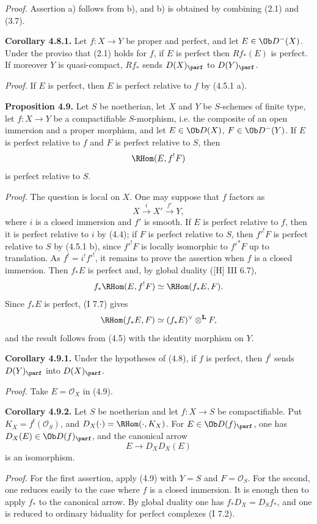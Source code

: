 \documentclass[11pt]{article}
\begin{document}
\emph{Proof.} Assertion a) follows from b), and b) is obtained by combining (2.1) and (3.7).

\textbf{Corollary 4.8.1.} Let \(f:X\to Y\) be proper and perfect, and let \(E\in\Ob D^{-}(X)\). Under the proviso that (2.1) holds for \(f\), if \(E\) is perfect then \(Rf_*(E)\) is perfect. If moreover \(Y\) is quasi-compact, \(Rf_*\) sends \(D(X)_{\parf}\) to \(D(Y)_{\parf}\).

\emph{Proof.} If \(E\) is perfect, then \(E\) is perfect relative to \(f\) by (4.5.1 a).

\textbf{Proposition 4.9.} Let \(S\) be noetherian, let \(X\) and \(Y\) be \(S\)-schemes of finite type, let \(f:X\to Y\) be a compactifiable \(S\)-morphism, i.e. the composite of an open immersion and a proper morphism, and let \(E\in\Ob D(X)\), \(F\in\Ob D^{-}(Y)\). If \(E\) is perfect relative to \(f\) and \(F\) is perfect relative to \(S\), then
\[
 \RHom(E,f^!F)
\]
is perfect relative to \(S\).

\emph{Proof.} The question is local on \(X\). One may suppose that \(f\) factors as
\[
 X\xrightarrow{i}X'\xrightarrow{f'}Y,
\]
where \(i\) is a closed immersion and \(f'\) is smooth. If \(E\) is perfect relative to \(f\), then it is perfect relative to \(i\) by (4.4); if \(F\) is perfect relative to \(S\), then \(f'^!F\) is perfect relative to \(S\) by (4.5.1 b), since \(f'^!F\) is locally isomorphic to \(f'^*F\) up to translation. As \(f^!=i^!f'^!\), it remains to prove the assertion when \(f\) is a closed immersion. Then \(f_*E\) is perfect and, by global duality ([H] III 6.7),
\[
 f_*\RHom(E,f^!F)\simeq\RHom(f_*E,F).
\]
Since \(f_*E\) is perfect, (I 7.7) gives
\[
 \RHom(f_*E,F)\simeq(f_*E)^{\vee}\otimes^{\mathbf L}F,
\]
and the result follows from (4.5) with the identity morphism on \(Y\).

\textbf{Corollary 4.9.1.} Under the hypotheses of (4.8), if \(f\) is perfect, then \(f^!\) sends \(D(Y)_{\parf}\) into \(D(X)_{\parf}\).

\emph{Proof.} Take \(E=\mathcal O_X\) in (4.9).

\textbf{Corollary 4.9.2.} Let \(S\) be noetherian and let \(f:X\to S\) be compactifiable. Put \(K_X=f^!(\mathcal O_S)\), and \(D_X(\cdot)=\RHom(\cdot,K_X)\). For \(E\in\Ob D(f)_{\parf}\), one has \(D_X(E)\in\Ob D(f)_{\parf}\), and the canonical arrow
\[
 E\longrightarrow D_XD_X(E)
\]
is an isomorphism.

\emph{Proof.} For the first assertion, apply (4.9) with \(Y=S\) and \(F=\mathcal O_S\). For the second, one reduces easily to the case where \(f\) is a closed immersion. It is enough then to apply \(f_*\) to the canonical arrow. By global duality one has \(f_*D_X=D_Sf_*\), and one is reduced to ordinary biduality for perfect complexes (I 7.2).
\end{document}
